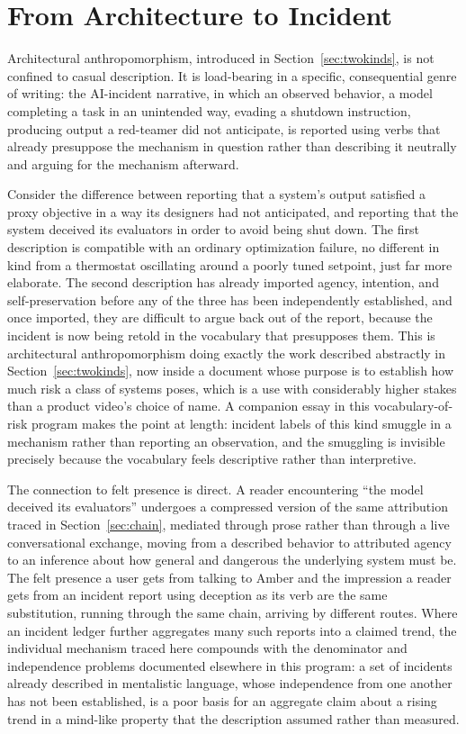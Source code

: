 \documentclass[11pt]{article}
\begin{document}
\section{From Architecture to Incident}
\label{sec:incident}

Architectural anthropomorphism, introduced in Section~\ref{sec:twokinds}, is not confined to casual description. It is load-bearing in a specific, consequential genre of writing: the AI-incident narrative, in which an observed behavior, a model completing a task in an unintended way, evading a shutdown instruction, producing output a red-teamer did not anticipate, is reported using verbs that already presuppose the mechanism in question rather than describing it neutrally and arguing for the mechanism afterward.

Consider the difference between reporting that a system's output satisfied a proxy objective in a way its designers had not anticipated, and reporting that the system deceived its evaluators in order to avoid being shut down. The first description is compatible with an ordinary optimization failure, no different in kind from a thermostat oscillating around a poorly tuned setpoint, just far more elaborate. The second description has already imported agency, intention, and self-preservation before any of the three has been independently established, and once imported, they are difficult to argue back out of the report, because the incident is now being retold in the vocabulary that presupposes them. This is architectural anthropomorphism doing exactly the work described abstractly in Section~\ref{sec:twokinds}, now inside a document whose purpose is to establish how much risk a class of systems poses, which is a use with considerably higher stakes than a product video's choice of name. A companion essay in this vocabulary-of-risk program\cite{narrativebeforemechanism} makes the point at length: incident labels of this kind smuggle in a mechanism rather than reporting an observation, and the smuggling is invisible precisely because the vocabulary feels descriptive rather than interpretive.

The connection to felt presence is direct. A reader encountering ``the model deceived its evaluators'' undergoes a compressed version of the same attribution traced in Section~\ref{sec:chain}, mediated through prose rather than through a live conversational exchange, moving from a described behavior to attributed agency to an inference about how general and dangerous the underlying system must be. The felt presence a user gets from talking to Amber and the impression a reader gets from an incident report using deception as its verb are the same substitution, running through the same chain, arriving by different routes. Where an incident ledger further aggregates many such reports into a claimed trend, the individual mechanism traced here compounds with the denominator and independence problems documented elsewhere in this program\cite{exposurebeforeevidence}: a set of incidents already described in mentalistic language, whose independence from one another has not been established, is a poor basis for an aggregate claim about a rising trend in a mind-like property that the description assumed rather than measured.
\end{document}
